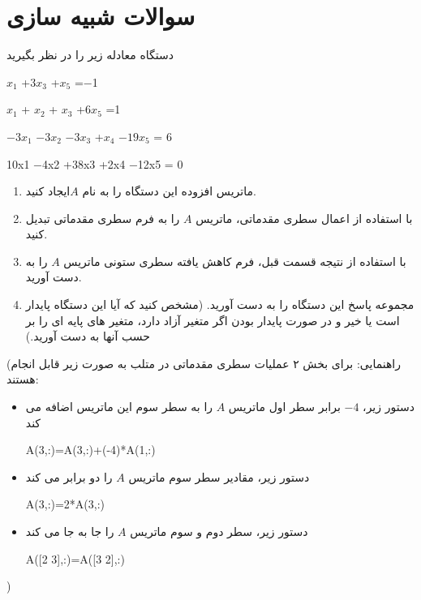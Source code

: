 \documentclass{article}
\begin{document}
\clearpage


\clearpage
\section{سوالات شبیه سازی}


دستگاه معادله زیر را در نظر بگیرید

\begin{latin}
	$x_1$ +$3x_3$ +$x_5$ =−1
	
	 $x_1$ + $x_2$ + $x_3$ +$6x_5$ =1
	 
	  $−3x_1$ −$3x_2$ −$3x_3$ +$x_4$ −$19x_5$ = 6
	  
	   10x1 −4x2 +38x3 +2x4 −12x5 = 0
	\end{latin}
\begin{enumerate}
	\item
	ماتریس افزوده این دستگاه را به نام $A$ایجاد کنید.
	\item 
	با استفاده از اعمال سطری مقدماتی، ماتریس $A$ را به فرم سطری مقدماتی تبدیل کنید.
	\item 
با استفاده از نتیجه قسمت قبل، فرم کاهش یافته سطری ستونی ماتریس $A$  را به دست آورید.
\item 
مجموعه پاسخ این دستگاه را به دست آورید. (مشخص کنید که آیا این دستگاه پایدار است یا خیر و در صورت پایدار بودن اگر متغیر آزاد دارد، متغیر های پایه ای را بر حسب آنها به دست آورید.)
\end{enumerate}

(راهنمایی:
 برای بخش ۲ عملیات سطری مقدماتی در متلب به صورت زیر قابل انجام هستند:
 \begin{itemize}
 	\item 
 	دستور زیر، $-4$ برابر سطر اول ماتریس $A$ را به سطر سوم این ماتریس اضافه می کند
 	\begin{latin}
 		A(3,:)=A(3,:)+(-4)*A(1,:)
 	\end{latin}
  	\item 
 دستور زیر، مقادیر سطر سوم ماتریس $A$ را دو برابر می کند
 \begin{latin}
 	A(3,:)=2*A(3,:)
 \end{latin}
 	\item 
دستور زیر، سطر دوم و سوم ماتریس $A$ را جا به جا می کند
\begin{latin}
	A([2 3],:)=A([3 2],:)
\end{latin}
\end{itemize}
	
)


\clearpage
{}
\end{document}
